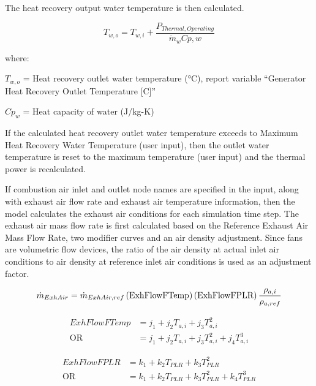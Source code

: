The heat recovery output water temperature is then calculated.

\begin{equation}
  T_{w,o} = T_{w,i} + \frac{P_{Thermal,Operating}}{\dot{m}_w C{p,w}}
\end{equation}

where:

\({T_{w,o}}\) = Heat recovery outlet water temperature (°C), report variable ``Generator Heat Recovery Outlet Temperature {[}C{]}''

\(C{p_w}\) = Heat capacity of water (J/kg-K)

If the calculated heat recovery outlet water temperature exceeds to Maximum Heat Recovery Water Temperature (user input), then the outlet water temperature is reset to the maximum temperature (user input) and the thermal power is recalculated.

If combustion air inlet and outlet node names are specified in the input, along with exhaust air flow rate and exhaust air temperature information, then the model calculates the exhaust air conditions for each simulation time step. The exhaust air mass flow rate is first calculated based on the Reference Exhaust Air Mass Flow Rate, two modifier curves and an air density adjustment. Since fans are volumetric flow devices, the ratio of the air density at actual inlet air conditions to air density at reference inlet air conditions is used as an adjustment factor.

\begin{equation}
  \dot{m}_{ExhAir} = \dot{m}_{ExhAir,ref} \PB{\text{ExhFlowFTemp}} \PB{\text{ExhFlowFPLR}} \frac{\rho_{a,i}}{\rho_{a,ref}}
\end{equation}

\begin{equation}
  \begin{array}{cc}
    ExhFlowFTemp     &= j_1 + j_2 T_{a,i} + j_3 T_{a,i}^2 \\
           \text{OR} &= j_1 + j_2 T_{a,i} + j_3 T_{a,i}^2 + j_4 T_{a,i}^3
  \end{array}
\end{equation}

\begin{equation}
  \begin{array}{cc}
    ExhFlowFPLR      &= k_1 + k_2 T_{PLR} + k_3 T_{PLR}^2 \\
           \text{OR} &= k_1 + k_2 T_{PLR} + k_3 T_{PLR}^2 + k_4 T_{PLR}^3
  \end{array}
\end{equation}

